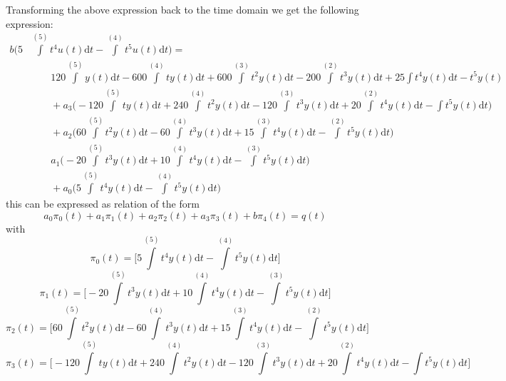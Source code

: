 \documentclass[letterpaper%
, twoside%
, 12pt%
,memoire%
, english%
,creativecommons,hyperref%
]{thETS}
\begin{document}
Transforming the above expression back to the time domain we get the following expression:
\begin{equation}\label{eqn.34}
\begin{split}
b\big(5 &\int\limits^{(5)} t^4 u(t) \mathrm{d}t - \int\limits^{(4)} t^5 u(t) \mathrm{d}t\big) =\\
&\qquad{}120\int\limits^{(5)}y(t) \mathrm{d}t - 600\int\limits^{(4)}ty(t)\mathrm{d}t + 600\int\limits^{(3)}t^2y(t)\mathrm{d}t - 200\int\limits^{(2)}t^3y(t)\mathrm{d}t + 25\int t^4y(t)\mathrm{d}t- t^5y(t)  \, \\
&\qquad{}+ a_{3}\bigg(-120\int\limits^{(5)}ty(t) \mathrm{d}t + 240\int\limits^{(4)}t^2y(t)\mathrm{d}t - 120\int\limits^{(3)}t^3y(t)\mathrm{d}t + 20\int\limits^{(2)}t^4y(t)\mathrm{d}t - \int t^5y(t)\mathrm{d}t\bigg)  \, \\ 
&\qquad{}+ a_{2}\bigg(60\int\limits^{(5)}t^2y(t) \mathrm{d}t - 60\int\limits^{(4)}t^3y(t)\mathrm{d}t + 15\int\limits^{(3)}t^4y(t)\mathrm{d}t - \int\limits^{(2)} t^5y(t)\mathrm{d}t \bigg)  \, \\
&\qquad{} a_{1}\bigg(-20\int\limits^{(5)}t^3y(t) \mathrm{d}t + 10\int\limits^{(4)}t^4y(t)\mathrm{d}t - \int\limits^{(3)}t^5y(t)\mathrm{d}t \bigg)  \, \\
&\qquad{}+ a_{0}\bigg(5\int\limits^{(5)}t^4y(t) \mathrm{d}t - \int\limits^{(4)}t^5y(t)\mathrm{d}t \bigg)
\end{split}
\end{equation}
this can be expressed as relation of the form
\begin{equation}\label{eqn.35}
a_{0}\pi_{0}(t) + a_{1}\pi_{1}(t) + a_{2}\pi_{2}(t) + a_{3}\pi_{3}(t) + b\pi_{4}(t) = q(t)
\end{equation}
with
\begin{equation*}
\pi_{0}(t) = \bigg[5\int\limits^{(5)}t^4y(t) \mathrm{d}t - \int\limits^{(4)}t^5y(t)\mathrm{d}t\bigg]
\end{equation*}
\begin{equation*}
\pi_{1}(t) = \bigg[-20\int\limits^{(5)}t^3y(t) \mathrm{d}t + 10\int\limits^{(4)}t^4y(t)\mathrm{d}t - \int\limits^{(3)}t^5y(t)\mathrm{d}t\bigg]
\end{equation*}
\begin{equation*}
\pi_{2} (t) = \bigg[60\int\limits^{(5)}t^2y(t) \mathrm{d}t - 60\int\limits^{(4)}t^3y(t)\mathrm{d}t + 15\int\limits^{(3)}t^4y(t)\mathrm{d}t - \int\limits^{(2)} t^5y(t)\mathrm{d}t \bigg]
\end{equation*}
\begin{equation*}
\pi_{3}(t) = \bigg[-120\int\limits^{(5)}ty(t) \mathrm{d}t + 240\int\limits^{(4)}t^2y(t)\mathrm{d}t - 120\int\limits^{(3)}t^3y(t)\mathrm{d}t + 20\int\limits^{(2)}t^4y(t)\mathrm{d}t - \int t^5y(t)\mathrm{d}t \bigg]
\end{equation*}
\end{document}
